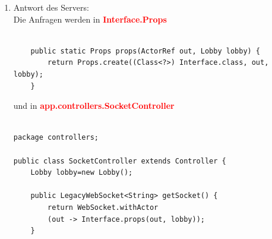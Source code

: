 \begin{itemize}
\begin{enumerate}
\begin{enumerate}
\begin{lstlisting}[frame=single]
package actors.serverInterface;

public class Interface extends UntypedActor {
     * jsonNode Actors management for messages 
     *from Client and answer back to client
     * @param json
     */
    private synchronized void messageActor(JsonNode json)
     throws JsonProcessingException {

        String jsonKey = json.fields().next().getKey();
        
        
        //------------------Message Type ----------------
        
        
        switch (jsonKey) {
            case "Hello":
                this.out.tell(TOJSON.replayMessage("Hey Client , im Server ")
                .toString() + "\n", self());
                this.output(TOJSON.replayMessage("Hey Client , im Server"));
            break;
            case "Start":
                this.out.tell(TOJSON.message("Start", "OK")
                .toString() + "\n", self());
                this.output(TOJSON.message("Start", "OK"));
            break;
            
            
            case "PERSONAL":
                this.personal = Json.fromJson(json.get("PERSONAL"), Personal.class);
                lobby.addPersonalInLobby
                (this.personal);
             break;
             
             }
           }
          }  
\end{lstlisting}



\item Antwort des Servers:\\
Die Anfragen werden in \textcolor{red}{\textbf{Interface.Props}} \\
\begin{lstlisting}[frame=single]
	
    public static Props props(ActorRef out, Lobby lobby) {
        return Props.create((Class<?>) Interface.class, out, lobby);
    }
\end{lstlisting}

und in \textcolor{red}{\textbf{app.controllers.SocketController}}\\
\begin{lstlisting}[frame=single]

package controllers;

public class SocketController extends Controller {
    Lobby lobby=new Lobby();

    public LegacyWebSocket<String> getSocket() {
        return WebSocket.withActor
        (out -> Interface.props(out, lobby));
    }


\end{lstlisting}
\end{enumerate}
\end{enumerate}
\end{itemize}
